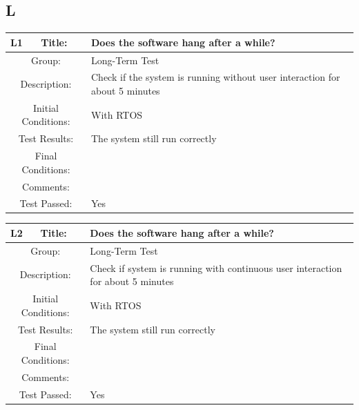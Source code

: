 \documentclass[12pt]{article}
\begin{document}
\subsection{L}
		\begin{table}[H]
	\begin{center}
		\begin{tabular}{| m{2cm}|m{2cm}|m{12cm}|}
			\hline 
			\bf L1&\bf Title:&\bf Does the software hang after a while?\\ 
			\hline 
			\multicolumn{2}{|c|}{Group:}&Long-Term Test\\ 
			\hline 
			\multicolumn{2}{|c|}{Description:}&Check if the system is running without user interaction for about 5 minutes\\ 
			\hline 
			\multicolumn{2}{|c|}{Initial Conditions:}&With RTOS\\ 
			\hline 
			\multicolumn{2}{|c|}{Test Results:}&The system still run correctly\\ 
			\hline 
			\multicolumn{2}{|c|}{Final Conditions:}&\\ 
			\hline 
			\multicolumn{2}{|c|}{Comments:}&\\ 
			\hline 
			\multicolumn{2}{|c|}{Test Passed:}&Yes \\ 
			\hline 
		\end{tabular} 
	\end{center}
\end{table}	
		\begin{table}[H]
	\begin{center}
		\begin{tabular}{| m{2cm}|m{2cm}|m{12cm}|}
			\hline 
			\bf L2&\bf Title:&\bf Does the software hang after a while?\\ 
			\hline 
			\multicolumn{2}{|c|}{Group:}&Long-Term Test\\ 
			\hline 
			\multicolumn{2}{|c|}{Description:}&Check if system is running with continuous user interaction for about 5 minutes\\ 
			\hline 
			\multicolumn{2}{|c|}{Initial Conditions:}&With RTOS\\ 
			\hline 
			\multicolumn{2}{|c|}{Test Results:}&The system still run correctly\\ 
			\hline 
			\multicolumn{2}{|c|}{Final Conditions:}&\\ 
			\hline 
			\multicolumn{2}{|c|}{Comments:}&\\ 
			\hline 
			\multicolumn{2}{|c|}{Test Passed:}&Yes \\ 
			\hline 
		\end{tabular} 
	\end{center}
\end{table}	
\end{document}

